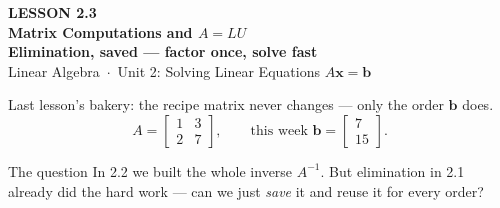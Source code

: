 \documentclass[aspectratio=169, 11pt]{beamer}
\newcommand{\xx}{\mathbf{x}}
\newcommand{\bb}{\mathbf{b}}
\begin{document}
{
\begin{frame}[plain]
  \vspace{2.8cm}\hspace{0.55cm}%
  \begin{minipage}{0.9\textwidth}
    {\color{goldacc}\bfseries\small LESSON 2.3}\\[0.5cm]
    {\color{white}\bfseries\LARGE Matrix Computations and $A=LU$}\\[0.3cm]
    {\color{white}\bfseries\large Elimination, saved --- factor once, solve fast}\\[1.0cm]
    {\color{blushmid}\small Linear Algebra~$\cdot$~Unit 2: Solving Linear Equations $A\xx=\bb$}
  \end{minipage}
\end{frame}
}

\begin{frame}[t, plain]
  Last lesson's bakery: the recipe matrix never changes --- only the order $\bb$ does.
  \[
    A = \begin{bmatrix} 1 & 3 \\ 2 & 7 \end{bmatrix}, \qquad
    \text{this week } \bb = \begin{bmatrix} 7 \\ 15 \end{bmatrix}.
  \]
  \begin{block}{The question}
    In 2.2 we built the whole inverse $A^{-1}$. But elimination in 2.1 already did the hard work ---
    can we just \emph{save} it and reuse it for every order?
  \end{block}
\end{frame}
\end{document}
